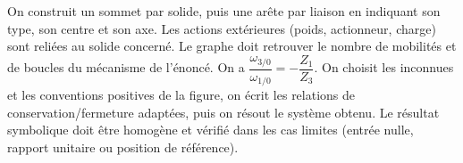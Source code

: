 \begin{corrigebox}
On construit un sommet par solide, puis une arête par liaison en
        indiquant son type, son centre et son axe. Les actions extérieures (poids,
        actionneur, charge) sont reliées au solide concerné. Le graphe doit retrouver le
        nombre de mobilités et de boucles du mécanisme de l'énoncé.
On a $\dfrac{\omega_{3/0}}{\omega_{1/0}}=-\dfrac{Z_1}{Z_3}$.
On choisit les inconnues et les conventions positives de la figure,
        on écrit les relations de conservation/fermeture adaptées, puis on résout le
        système obtenu. Le résultat symbolique doit être homogène et vérifié dans les cas
        limites (entrée nulle, rapport unitaire ou position de référence).
\end{corrigebox}
